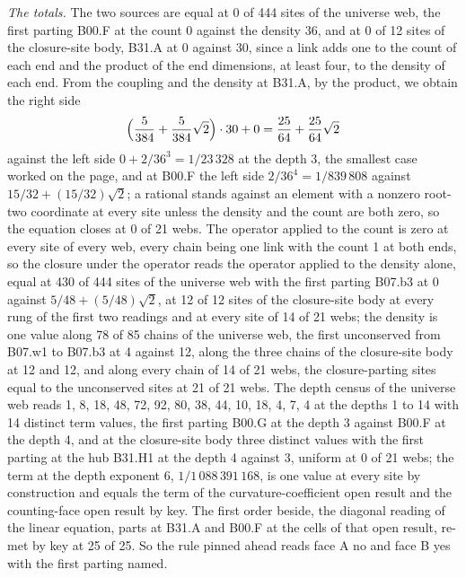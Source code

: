 \begin{chproof}
\textit{The totals.} The two sources are equal at 0 of 444 sites of the universe web, the first parting B00.F at the count 0 against the density 36, and at 0 of 12 sites of the closure-site body, B31.A at 0 against 30, since a link adds one to the count of each end and the product of the end dimensions, at least four, to the density of each end. From the coupling and the density at B31.A, by the product, we obtain the right side
\begin{equation}
\Bigl(\frac{5}{384} + \frac{5}{384}\sqrt{2}\Bigr)\cdot 30 + 0 = \frac{25}{64} + \frac{25}{64}\sqrt{2}
\end{equation}
against the left side $0 + 2/36^{3} = 1/23\,328$ at the depth 3, the smallest case worked on the page, and at B00.F the left side $2/36^{4} = 1/839\,808$ against $15/32 + (15/32)\sqrt{2}$; a rational stands against an element with a nonzero root-two coordinate at every site unless the density and the count are both zero, so the equation closes at 0 of 21 webs. The operator applied to the count is zero at every site of every web, every chain being one link with the count 1 at both ends, so the closure under the operator reads the operator applied to the density alone, equal at 430 of 444 sites of the universe web with the first parting B07.b3 at 0 against $5/48 + (5/48)\sqrt{2}$, at 12 of 12 sites of the closure-site body at every rung of the first two readings and at every site of 14 of 21 webs; the density is one value along 78 of 85 chains of the universe web, the first unconserved from B07.w1 to B07.b3 at 4 against 12, along the three chains of the closure-site body at 12 and 12, and along every chain of 14 of 21 webs, the closure-parting sites equal to the unconserved sites at 21 of 21 webs. The depth census of the universe web reads 1, 8, 18, 48, 72, 92, 80, 38, 44, 10, 18, 4, 7, 4 at the depths 1 to 14 with 14 distinct term values, the first parting B00.G at the depth 3 against B00.F at the depth 4, and at the closure-site body three distinct values with the first parting at the hub B31.H1 at the depth 4 against 3, uniform at 0 of 21 webs; the term at the depth exponent 6, $1/1\,088\,391\,168$, is one value at every site by construction and equals the term of the curvature-coefficient open result and the counting-face open result by key. The first order beside, the diagonal reading of the linear equation, parts at B31.A and B00.F at the cells of that open result, re-met by key at 25 of 25. So the rule pinned ahead reads face A no and face B yes with the first parting named.


\end{chproof}
